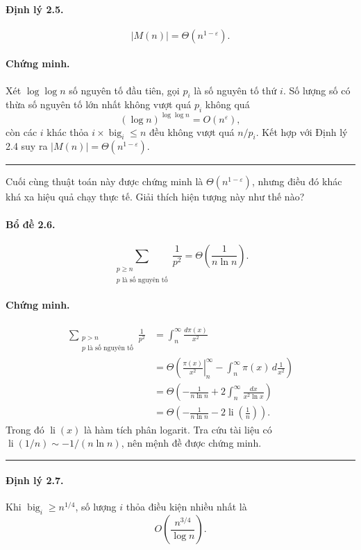 \documentclass[11pt]{article}
\newcommand{\qedmark}{\hfill\rule{0.7ex}{0.7ex}}
\begin{document}
\paragraph{Định lý 2.5.}
\[
  |M(n)|=\Theta(n^{1-\varepsilon}).
\]

\paragraph{Chứng minh.}
Xét \(\log\log n\) số nguyên tố đầu tiên, gọi \(p_i\) là số nguyên tố thứ \(i\).
Số lượng số có thừa số nguyên tố lớn nhất không vượt quá \(p_i\) không quá
\[
  (\log n)^{\log\log n}=O\left(n^{\varepsilon}\right),
\]
còn các \(i\) khác thỏa \(i\times \operatorname{big}_i\le n\) đều không vượt
quá \(n/p_i\). Kết hợp với Định lý 2.4 suy ra
\(|M(n)|=\Theta(n^{1-\varepsilon})\). \qedmark

Cuối cùng thuật toán này được chứng minh là \(\Theta(n^{1-\varepsilon})\),
nhưng điều đó khác khá xa hiệu quả chạy thực tế. Giải thích hiện tượng này như
thế nào?

\paragraph{Bổ đề 2.6.}
\[
  \sum_{\substack{p\ge n\\p\text{ là số nguyên tố}}}\frac{1}{p^2}
  =\Theta\left(\frac{1}{n\ln n}\right).
\]

\paragraph{Chứng minh.}
\[
\begin{aligned}
  \sum_{\substack{p>n\\p\text{ là số nguyên tố}}}\frac{1}{p^2}
  &=\int_n^\infty \frac{d\pi(x)}{x^2}\\
  &=\Theta\left(\left.\frac{\pi(x)}{x^2}\right|_n^\infty
      -\int_n^\infty \pi(x)\,d\frac{1}{x^2}\right)\\
  &=\Theta\left(-\frac{1}{n\ln n}
      +2\int_n^\infty\frac{dx}{x^2\ln x}\right)\\
  &=\Theta\left(-\frac{1}{n\ln n}-2\operatorname{li}\left(\frac1n\right)\right).
\end{aligned}
\]
Trong đó \(\operatorname{li}(x)\) là hàm tích phân logarit. Tra cứu tài liệu có
\(\operatorname{li}(1/n)\sim -1/(n\ln n)\), nên mệnh đề được chứng minh.
\qedmark

\paragraph{Định lý 2.7.}
Khi \(\operatorname{big}_i\ge n^{1/4}\), số lượng \(i\) thỏa điều kiện nhiều
nhất là
\[
  O\left(\frac{n^{3/4}}{\log n}\right).
\]
\end{document}
